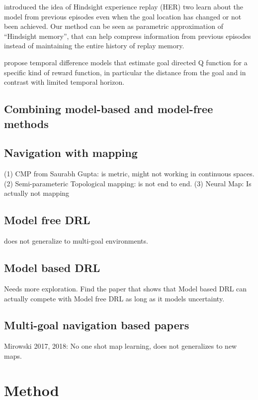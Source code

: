 \documentclass[letterpaper]{article} %
\begin{document}
\citet{andrychowicz2016learning} introduced the idea of Hindsight experience replay (HER) two learn about the model from previous episodes even when the goal location has changed or not been achieved.
Our method can be seen as parametric approximation of ``Hindsight memory'',
that can help compress information from previous episodes instead of maintaining the
entire history of replay memory.

\cite{pong2018temporal} propose temporal difference models that estimate goal directed Q function for a specific kind of reward function, in particular the distance from the goal and in contrast with limited temporal horizon.

\subsection{Combining model-based and model-free methods}




\subsection{Navigation with mapping}
 (1) CMP from Saurabh Gupta: is metric, might not working in continuous spaces.
 (2) Semi-parameteric Topological mapping: is not end to end.
 (3) Neural Map: Is actually not mapping

\subsection{Model free DRL }
does not generalize to multi-goal environments.

\subsection{Model based DRL}
Needs more exploration.
Find the paper that shows that Model based DRL can actually compete with Model free DRL as long as it models uncertainty.

\subsection{Multi-goal navigation based papers}
Mirowski 2017, 2018: No one shot map learning, does not generalizes to new maps.


\section{Method}
\end{document}
